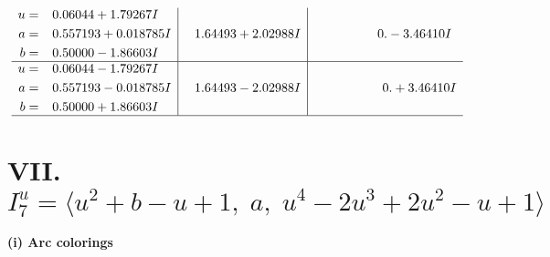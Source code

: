\documentclass[1p]{elsarticle_modified}
\theoremstyle{definition}
\begin{document}
$$\begin{array}{c|c|c}
\begin{aligned}
u &= \phantom{-}0.06044 + 1.79267 I \\
a &= \phantom{-}0.557193 + 0.018785 I \\
b &= \phantom{-}0.50000 - 1.86603 I\end{aligned}
 & \phantom{-}1.64493 + 2.02988 I & \phantom{-0.000000 } 0. - 3.46410 I \\ \hline\begin{aligned}
u &= \phantom{-}0.06044 - 1.79267 I \\
a &= \phantom{-}0.557193 - 0.018785 I \\
b &= \phantom{-}0.50000 + 1.86603 I\end{aligned}
 & \phantom{-}1.64493 - 2.02988 I & \phantom{-0.000000 -}0. + 3.46410 I\\
 \hline 
 \end{array}$$\newpage\newpage\renewcommand{\arraystretch}{1}
\centering \section*{VII. $I^u_{7}= \langle u^2+b- u+1,\;a,\;u^4-2 u^3+2 u^2- u+1 \rangle$}
\flushleft \textbf{(i) Arc colorings}\\
\end{document}

